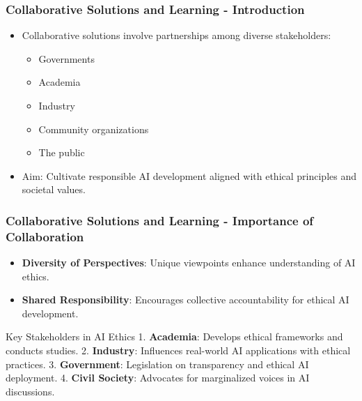 \documentclass[aspectratio=169]{beamer}
\begin{document}
\begin{frame}[fragile]
    \frametitle{Collaborative Solutions and Learning - Introduction}
    \begin{itemize}
        \item Collaborative solutions involve partnerships among diverse stakeholders:
            \begin{itemize}
                \item Governments
                \item Academia
                \item Industry
                \item Community organizations
                \item The public
            \end{itemize}
        \item Aim: Cultivate responsible AI development aligned with ethical principles and societal values.
    \end{itemize}
\end{frame}

\begin{frame}[fragile]
    \frametitle{Collaborative Solutions and Learning - Importance of Collaboration}
    \begin{itemize}
        \item \textbf{Diversity of Perspectives}: Unique viewpoints enhance understanding of AI ethics.
        \item \textbf{Shared Responsibility}: Encourages collective accountability for ethical AI development.
    \end{itemize}

    \begin{block}{Key Stakeholders in AI Ethics}
        1. \textbf{Academia}: Develops ethical frameworks and conducts studies.
        2. \textbf{Industry}: Influences real-world AI applications with ethical practices.
        3. \textbf{Government}: Legislation on transparency and ethical AI deployment.
        4. \textbf{Civil Society}: Advocates for marginalized voices in AI discussions.
    \end{block}
\end{frame}
\end{document}
